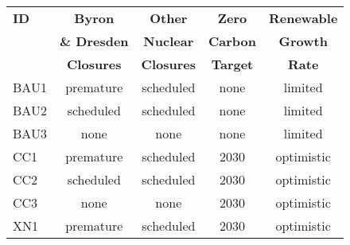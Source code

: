 \begin{table}[ht]
        \centering
        \begin{tabular}{lcccc}
                \hline
                \textbf{ID} & \textbf{Byron}      & \textbf{Other}  & \textbf{Zero} & \textbf{Renewable} \\
                            & \textbf{\& Dresden} & \textbf{Nuclear} & \textbf{Carbon} & \textbf{Growth}\\
                            & \textbf{Closures} & \textbf{Closures} &  \textbf{Target}  & \textbf{Rate}\\
                \hline
                        BAU1 & 
                        \cellcolor{red!25}premature & 
                        \cellcolor{orange!25}scheduled & 
                        \cellcolor{red!25}none &
                        \cellcolor{red!25}limited \\ 
                        BAU2 & 
                        \cellcolor{orange!25}scheduled & 
                        \cellcolor{orange!25}scheduled & 
                        \cellcolor{red!25}none &
                        \cellcolor{red!25}limited \\ 
                        BAU3 & 
                        \cellcolor{green!25}none & 
                        \cellcolor{green!25}none & 
                        \cellcolor{red!25}none &
                        \cellcolor{red!25}limited \\ 
                        CC1 & 
                        \cellcolor{red!25}premature & 
                        \cellcolor{orange!25}scheduled & 
                        \cellcolor{green!25}2030 &
                        \cellcolor{green!25}optimistic\\ 
                        CC2 & 
                        \cellcolor{orange!25}scheduled & 
                        \cellcolor{orange!25}scheduled & 
                        \cellcolor{green!25}2030 &
                        \cellcolor{green!25}optimistic\\ 
                        CC3 & 
                        \cellcolor{green!25}none & 
                        \cellcolor{green!25}none & 
                        \cellcolor{green!25}2030 &
                        \cellcolor{green!25}optimistic\\ 
                        XN1 & 
                        \cellcolor{red!25}premature & 
                        \cellcolor{orange!25}scheduled & 
                        \cellcolor{green!25}2030 &
                        \cellcolor{green!25}optimistic\\ 

\end{tabular}
\end{table}
